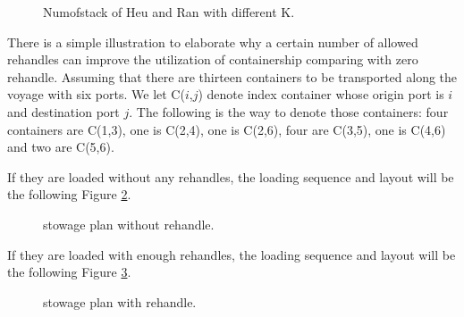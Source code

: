 \documentclass[review,3p,times,authoryear,12pt]{elsarticle}
\begin{document}
\begin{figure}[htbp]
\centering
\setlength{\abovecaptionskip}{10pt}
\caption{Numofstack of Heu and Ran with different K.}
\label{fig 2:graph}
\end{figure}

There is a simple illustration to elaborate why a certain number of allowed rehandles can improve the utilization of containership comparing with zero rehandle.
Assuming that there are thirteen containers to be transported along the voyage with six ports.
We let C($i$,$j$) denote index container whose origin port is $i$ and destination port $j$.
The following is the way to denote those containers: four containers are C(1,3), one is C(2,4), one is C(2,6), four are C(3,5), one is C(4,6) and two are C(5,6).

If they are loaded without any rehandles, the loading sequence and layout will be the following Figure \ref{fig 3:graph}.
\begin{figure}[htbp]
\centering
\setlength{\abovecaptionskip}{10pt}
\caption{stowage plan without rehandle.}
\label{fig 3:graph}
\end{figure}


If they are loaded with enough rehandles, the loading sequence and layout will be the following Figure \ref{fig 4:graph}.
\begin{figure}[htbp]
\centering
\setlength{\abovecaptionskip}{10pt}
\caption{stowage plan with rehandle.}
\label{fig 4:graph}
\end{figure}
\end{document}
